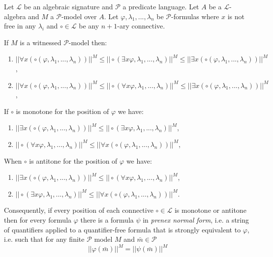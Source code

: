 \documentclass{lmcs} %
\newcommand{\?}{\ensuremath{\mkern0.4\thinmuskip}}
\let\phi=\varphi
\newcommand{\CL}{\mathcal{L}}
\newcommand{\CP}{\mathcal{P}}
\begin{document}
\begin{prop}  
    Let $\CL$ be an algebraic signature and $\CP$ a predicate language. Let $A$ be a $\CL$-algebra and $M$ a $\CP$-model over $A$. Let $\phi,\lambda_1,...,\lambda_n$ be $\CP$-formulas where $x$ is not free in any $\lambda_i$ and $\circ\in\CL$ be any $n+1$-ary connective.

    \noindent
    If $M$ is a witnessed $\CP$-model then:\begin{enumerate}[label=\roman*.]
    \item $||\forall x(\circ(\phi,\lambda_1,...,\lambda_n))||^M\leq ||\circ(\exists x\phi, \lambda_1,...,\lambda_n)||^M\leq||\exists x(\circ(\phi,\lambda_1,...,\lambda_n))||^M$,
    \item $||\forall x(\circ(\phi,\lambda_1,...,\lambda_n))||^M\leq||\circ(\forall x\phi,\lambda_1,...,\lambda_n)||^M\leq ||\exists x(\circ(\phi,\lambda_1,...,\lambda_n))||^M$,
    \end{enumerate}
    \noindent
    If $\circ$ is monotone for the position of $\phi$ we have: \begin{enumerate}
        \item [iii.] $||\exists x(\circ(\phi,\lambda_1,...,\lambda_n))||^M\leq||\circ(\exists x\phi,\lambda_1,...,\lambda_n)||^M$,
        \item [iv.] $||\circ(\forall x\phi, \lambda_1,...,\lambda_n)||^M\leq||\forall x(\circ(\phi,\lambda_1,...,\lambda_n))||^M$,
    \end{enumerate}
    \noindent
    When $\circ$ is antitone for the position of $\phi$ we have:\begin{enumerate}
        \item [v.] $||\exists x(\circ(\phi,\lambda_1,...,\lambda_n))||^M \leq ||\circ(\forall x\phi,\lambda_1,...,\lambda_n)||^M$,
        \item [vi.] $||\circ(\exists x\phi,\lambda_1,...,\lambda_n)||^M\leq||\forall x(\circ(\phi,\lambda_1,...,\lambda_n))||^M$. 
    \end{enumerate}
    \noindent
    Consequently, if every position of each connective $\circ\in\CL$ is monotone or antitone then for every formula $\phi$ there is a formula $\psi$ in \textit{prenex normal form}, i.e. a string of quantifiers applied to a quantifier-free formula that is strongly equivalent to $\phi$, i.e. such that for any finite $\CP$ model $M$ and $\bar{m}\in\CP$ \[||\phi(\bar{m})||^M=||\psi(\bar{m})||^M\]
\end{prop}
\end{document}
